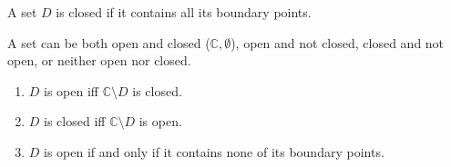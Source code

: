\begin{definition}
    A set $D$ is closed if it contains all its boundary points.
\end{definition}
\begin{remark}
    A set can be both open and closed ($\mathbb{C}, \emptyset$), open and not closed, closed and not open, or neither open nor closed.
\end{remark}
\begin{theorem}
    \begin{enumerate}
        \item $D$ is open iff $\mathbb{C} \setminus D$ is closed.
        \item $D$ is closed iff $\mathbb{C} \setminus D$ is open.
        \item $D$ is open if and only if it contains none of its boundary points.
    \end{enumerate}
\end{theorem}